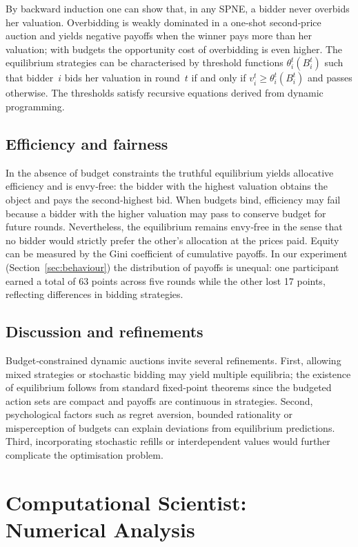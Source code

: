 By backward induction one can show that, in any SPNE, a bidder never overbids her valuation.  Overbidding is weakly dominated in a one‑shot second‑price auction \parencite{SpirakisAuctionsSlides} and yields negative payoffs when the winner pays more than her valuation; with budgets the opportunity cost of overbidding is even higher.  The equilibrium strategies can be characterised by threshold functions \(\theta_i^t(B_i^t)\) such that bidder~\(i\) bids her valuation in round~\(t\) if and only if \(v_i^t\ge \theta_i^t(B_i^t)\) and passes otherwise.  The thresholds satisfy recursive equations derived from dynamic programming.

\subsection{Efficiency and fairness}
In the absence of budget constraints the truthful equilibrium yields allocative efficiency and is envy‑free: the bidder with the highest valuation obtains the object and pays the second‑highest bid.  When budgets bind, efficiency may fail because a bidder with the higher valuation may pass to conserve budget for future rounds.  Nevertheless, the equilibrium remains envy‑free in the sense that no bidder would strictly prefer the other’s allocation at the prices paid.  Equity can be measured by the Gini coefficient of cumulative payoffs.  In our experiment (Section~\ref{sec:behaviour}) the distribution of payoffs is unequal: one participant earned a total of 63 points across five rounds while the other lost 17 points, reflecting differences in bidding strategies.

\subsection{Discussion and refinements}
Budget‑constrained dynamic auctions invite several refinements.  First, allowing mixed strategies or stochastic bidding may yield multiple equilibria; the existence of equilibrium follows from standard fixed‑point theorems since the budgeted action sets are compact and payoffs are continuous in strategies.  Second, psychological factors such as regret aversion, bounded rationality or misperception of budgets can explain deviations from equilibrium predictions.  Third, incorporating stochastic refills or interdependent values would further complicate the optimisation problem.

\section{Computational Scientist: Numerical Analysis}

